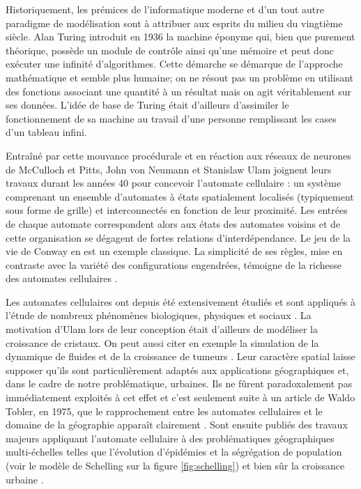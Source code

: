 \documentclass[12pt]{article}
\begin{document}
Historiquement, les prémices de l'informatique moderne et d'un tout
autre paradigme de modélisation sont à attribuer aux esprits du milieu
du vingtième siècle. Alan Turing introduit en 1936 la machine éponyme
qui, bien que purement théorique, possède un module de contrôle ainsi
qu'une mémoire et peut donc exécuter une infinité d'algorithmes. Cette
démarche se démarque de l'approche mathématique et semble plus
humaine; on ne résout pas un problème en utilisant des fonctions
associant une quantité à un résultat mais on agit véritablement sur
ses données. L'idée de base de Turing était d'ailleurs d'assimiler le
fonctionnement de sa machine au travail d'une personne remplissant les
cases d'un tableau infini.

Entraîné par cette mouvance procédurale et en réaction aux réseaux de
neurones de McCulloch et Pitts, John von Neumann et Stanislaw Ulam
joignent leurs travaux durant les années 40 pour concevoir l'automate
cellulaire : un système comprenant un ensemble d'automates à états
spatialement localisés (typiquement sous forme de grille) et
interconnectés en fonction de leur proximité. Les entrées de chaque
automate correspondent alors aux états des automates voisins et de
cette organisation se dégagent de fortes relations
d'interdépendance. Le jeu de la vie de Conway en est un exemple
classique. La simplicité de ses règles, mise en contraste avec la
variété des configurations engendrées, témoigne de la richesse des
automates cellulaires \cite{Gardner1970}.

Les automates cellulaires ont depuis été extensivement étudiés et sont
appliqués à l'étude de nombreux phénomènes biologiques, physiques et
sociaux \cite{Ganguly2003}. La motivation d'Ulam lors de leur
conception était d'ailleurs de modéliser la croissance de cristaux. On
peut aussi citer en exemple la simulation de la dynamique de fluides
\cite{Frisch1986} et de la croissance de tumeurs
\cite{Kansal2000}. Leur caractère spatial laisse supposer qu'ils sont
particulièrement adaptés aux applications géographiques et, dans le
cadre de notre problématique, urbaines. Ils ne fûrent paradoxalement
pas immédiatement exploités à cet effet et c'est seulement suite à un
article de Waldo Tobler, en 1975, que le rapprochement entre les
automates cellulaires et le domaine de la géographie apparaît
clairement \cite{Tobler1975}. Sont ensuite publiés des travaux majeurs
appliquant l'automate cellulaire à des problématiques géographiques
multi-échelles telles que l'évolution d'épidémies \cite{Fu2003} et la
ségrégation de population \cite{Schelling1969} (voir le modèle de
Schelling sur la figure \ref{fig:schelling}) et bien sûr la croissance
urbaine \cite{}.
\end{document}
